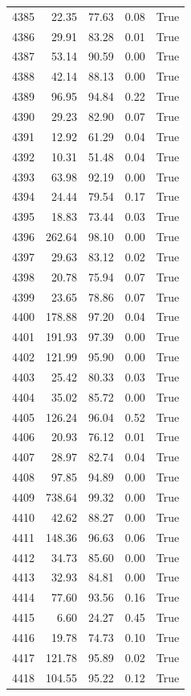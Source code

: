 \begin{longtable}{rrrrr}
4385 & 22.35 & 77.63 & 0.08 & True \\
4386 & 29.91 & 83.28 & 0.01 & True \\
4387 & 53.14 & 90.59 & 0.00 & True \\
4388 & 42.14 & 88.13 & 0.00 & True \\
4389 & 96.95 & 94.84 & 0.22 & True \\
4390 & 29.23 & 82.90 & 0.07 & True \\
4391 & 12.92 & 61.29 & 0.04 & True \\
4392 & 10.31 & 51.48 & 0.04 & True \\
4393 & 63.98 & 92.19 & 0.00 & True \\
4394 & 24.44 & 79.54 & 0.17 & True \\
4395 & 18.83 & 73.44 & 0.03 & True \\
4396 & 262.64 & 98.10 & 0.00 & True \\
4397 & 29.63 & 83.12 & 0.02 & True \\
4398 & 20.78 & 75.94 & 0.07 & True \\
4399 & 23.65 & 78.86 & 0.07 & True \\
4400 & 178.88 & 97.20 & 0.04 & True \\
4401 & 191.93 & 97.39 & 0.00 & True \\
4402 & 121.99 & 95.90 & 0.00 & True \\
4403 & 25.42 & 80.33 & 0.03 & True \\
4404 & 35.02 & 85.72 & 0.00 & True \\
4405 & 126.24 & 96.04 & 0.52 & True \\
4406 & 20.93 & 76.12 & 0.01 & True \\
4407 & 28.97 & 82.74 & 0.04 & True \\
4408 & 97.85 & 94.89 & 0.00 & True \\
4409 & 738.64 & 99.32 & 0.00 & True \\
4410 & 42.62 & 88.27 & 0.00 & True \\
4411 & 148.36 & 96.63 & 0.06 & True \\
4412 & 34.73 & 85.60 & 0.00 & True \\
4413 & 32.93 & 84.81 & 0.00 & True \\
4414 & 77.60 & 93.56 & 0.16 & True \\
4415 & 6.60 & 24.27 & 0.45 & True \\
4416 & 19.78 & 74.73 & 0.10 & True \\
4417 & 121.78 & 95.89 & 0.02 & True \\
4418 & 104.55 & 95.22 & 0.12 & True \\

\end{longtable}
